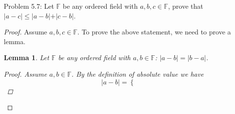 \documentclass{article}
\theoremstyle{claim}
\newtheorem{lemma}[theorem]{Lemma}
\theoremstyle{definition}
\begin{document}
\begin{enumerate}
\begin{enumerate}
\begin{proof}
\begin{enumerate}
                            Assume for $n = n_0$, $a_1, ..., a_n \in \mathbb{F}$. Assume $\sum\limits_{k=1}^n a_k^2 = 0$. By our inductive hypothesis, we have $a_1 = a_2 = ... = a_{n_0} = 0$. Assume $\exists a_{n_0 + 1} \in \mathbb{F}$. By trichotomy, exactly one of these holds: $a_{n_0 + 1} > 0, a_{n_0 + 1} = 0$, or $a_{n_0 + 1} < 0$. Whatever case that is, we know $a_{n_0 + 1}^2 \ge 0$. Now, we consider $\sum\limits_{k=1}^{n_0} a_k^2$.
                            \begin{equation}
                                \sum\limits_{k=1}^{n_0} a_k^2 + a_{n_0+1}^2 = \sum\limits_{k=1}^{n_0 + 1} a_k^2 \ge 0\\
                            \end{equation}
                    Our inductive hypothesis says that $\sum\limits_{k=1}^{n_0} a_k^2 = 0$.\\
                    And we know $a_{n_0 + 1}^2 \ge 0$. So the equality of the equation (1) holds if and only if $a_{n_0 + 1}^2 = 0$. This means that it must be the case that $a_{n_0 + 1} = 0$.\\
                    And so $a_1 = a_2 = ... = a_{n_0} = a_{n_0 + 1} = 0.$\\
                    So we have proved that:  If for $n = 1$, then if $a_1, ..., a_n \in \mathbb{F}$ and $\sum\limits_{k=1}^n a_k^2 = 0$, then $a_1 = a_2 = ... = a_n = 0$.\\
                    \end{enumerate}
                    Proving both claim (i) and (ii) completes our proof by induction on $n$. 
                \end{proof}
        \end{enumerate}
    \item[Problem 5.7:] Let $\mathbb{F}$ be any ordered field with $a, b, c \in \mathbb{F}$, prove that $\vert a - c \vert \le \vert a - b \vert + \vert c - b \vert$.
        \begin{proof}
            Assume $a, b, c \in \mathbb{F}$. To prove the above statement, we need to prove a lemma.
            \begin{lemma}
                Let $\mathbb{F}$ be any ordered field with $a, b \in \mathbb{F}$: $|a - b| = |b - a|$.
                \begin{proof}
                    Assume $a, b \in \mathbb{F}$. By the definition of absolute value we have
                    \begin{equation*}
                        |a - b| = \left\{
                            \begin{array}{rl}

\end{array}
\end{equation*}
\end{proof}
\end{lemma}
\end{proof}
\end{enumerate}
\end{document}
